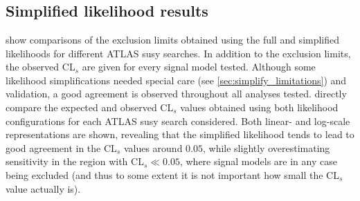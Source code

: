 
\chapter{}
\ifpdf
\graphicspath{{chapter-simplify/Figs/Raster/}{chapter-simplify/Figs/PDF/}{chapter-simplify/Figs/}}
\else
\graphicspath{{chapter-simplify/Figs/Vector/}{chapter-simplify/Figs/}}
\fi

\section{Simplified likelihood results}

 show comparisons of the exclusion limits obtained using the full and simplified likelihoods for different ATLAS \gls{susy} searches. In addition to the exclusion limits, the observed CL$_s$ are given for every signal model tested. Although some likelihood simplifications needed special care (see \cref{sec:simplify_limitations}) and validation, a good agreement is observed throughout all analyses tested.  directly compare the expected and observed CL$_s$ values obtained using both likelihood configurations for each ATLAS \gls{susy} search considered. Both linear- and log-scale representations are shown, revealing that the simplified likelihood tends to lead to good agreement in the CL$_s$ values around $0.05$, while slightly overestimating sensitivity in the region with CL$_s \ll 0.05$, where signal models are in any case being excluded (and thus to some extent it is not important how small the CL$_s$ value actually is).

\vspace{5em}

